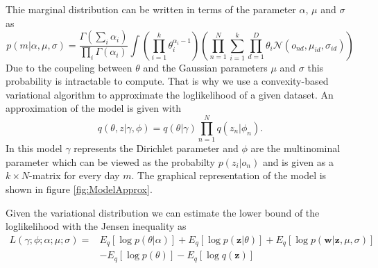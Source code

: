 \documentclass[11pt,a4paper]{article}
\begin{document}
Thie marginal distribution can be written in terms of the parameter $\alpha$, $\mu$ and $\sigma$ as
  \begin{equation}
   p(m|\alpha,\mu,\sigma) = \frac{\Gamma (\sum_i \alpha_i)}{\prod_i \Gamma(\alpha_i)} \int \left( \prod_{i=1}^k \theta_i^{\alpha_i-1} \right)
   \left( \prod_{n=1}^N \sum_{i=1}^k \prod_{d=1}^D \theta_i \mathcal{N}(o_{nd},\mu_{id},\sigma_{id} ) \right)
  \end{equation}
Due to the coupeling between $\theta$ and the Gaussian parameters $\mu$ and $\sigma$ this probability is intractable to compute. That is why we use a convexity-based variational algorithm to approximate the loglikelihood of a given dataset. 
An approximation of the model is given with 
  \begin{equation}
   q(\theta,z|\gamma,\phi) = q(\theta|\gamma) \prod_{n=1}^N q(z_n|\phi_n).
  \end{equation}
In this model $\gamma$ represents the Dirichlet parameter and $\phi$ are the multinominal parameter which can be viewed as the probabilty $p(z_i|o_n)$ and is given as a $k \times N$-matrix for every day $m$. The graphical representation of the model is shown in figure \ref{fig:ModelApprox}.
  
%  
%
%  
  
  
  
  Given the variational distribution we can estimate the lower bound of the loglikelihood with the Jensen inequality as
  \begin{equation}
   \begin{split}
    L(\gamma;\phi;\alpha;\mu;\sigma) =& E_q[\log p(\theta|\alpha)] + E_q[\log p(\textbf{z}|\theta)] + E_q[\log p(\textbf{w}|\textbf{z},\mu,\sigma)] \\
   & -E_q[\log p(\theta)] - E_q[\log q(\textbf{z})]
   \end{split}
  \end{equation}
\end{document}
